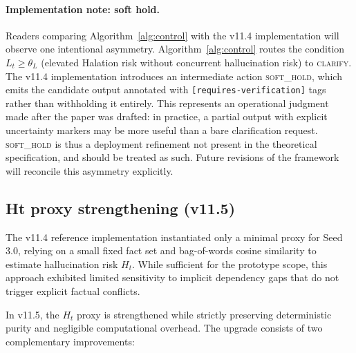 \documentclass[11pt,a4paper]{article}
\begin{document}
\paragraph{Implementation note: soft hold.}
\label{sec:softhold}
Readers comparing Algorithm~\ref{alg:control} with the v11.4 implementation
will observe one intentional asymmetry.
Algorithm~\ref{alg:control} routes the condition $L_t \geq \theta_L$
(elevated Halation risk without concurrent hallucination risk) to
\textsc{clarify}.
The v11.4 implementation introduces an intermediate action \textsc{soft\_hold},
which emits the candidate output annotated with \texttt{[requires-verification]}
tags rather than withholding it entirely.
This represents an operational judgment made after the paper was drafted:
in practice, a partial output with explicit uncertainty markers may be more
useful than a bare clarification request.
\textsc{soft\_hold} is thus a deployment refinement not present in the
theoretical specification, and should be treated as such.
Future revisions of the framework will reconcile this asymmetry explicitly.

\subsection{Ht proxy strengthening (v11.5)}
\label{sec:ht_proxy}

The v11.4 reference implementation instantiated only a minimal proxy for Seed 3.0,
relying on a small fixed fact set and bag-of-words cosine similarity to estimate
hallucination risk \(H_t\). While sufficient for the prototype scope, this approach
exhibited limited sensitivity to implicit dependency gaps that do not trigger explicit
factual conflicts.

In v11.5, the \(H_t\) proxy is strengthened while strictly preserving deterministic
purity and negligible computational overhead. The upgrade consists of two
complementary improvements:
\end{document}
